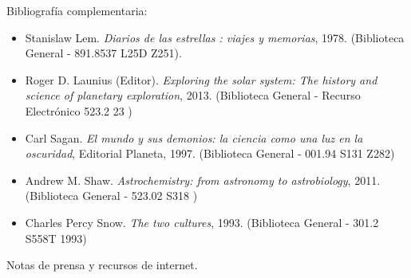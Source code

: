 \documentclass[letterpaper,10pt,onecolumn]{article}
\begin{document}
\noindent\normalsize Bibliograf\'ia complementaria:


\begin{itemize}
\item Stanislaw Lem. \textit{Diarios de las estrellas : viajes y
  memorias}, 1978. (Biblioteca General - 891.8537 L25D Z251). \\[-0.6cm]
\item Roger D. Launius (Editor). \textit{Exploring the solar system:
  The history and science of planetary exploration},
  2013. (Biblioteca General - Recurso Electr\'onico 523.2 23 )\\[-0.6cm]
\item Carl Sagan. \textit{El mundo y sus demonios: la ciencia
  como una luz en la oscuridad}, Editorial Planeta,
  1997. (Biblioteca General - 001.94 S131 Z282) \\[-0.6cm]
\item Andrew M. Shaw. \textit{Astrochemistry: from astronomy to astrobiology}, 2011. (Biblioteca General -  523.02 S318 )\\[-0.6cm]
\item Charles Percy Snow. \textit{The two cultures},
  1993. (Biblioteca General - 301.2 S558T 1993)\\[-0.6cm]
\end{itemize}

\noindent
Notas de prensa y recursos de internet.
\end{document}
